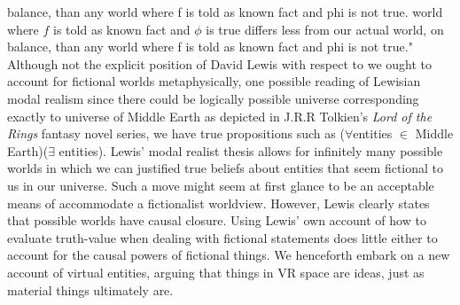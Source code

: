 balance, than any world where f is told as known fact and phi is not true.
world where $f$ is told as known fact and $\phi$ is true differs less from our actual world, on
balance, than any world where f is told as known fact and phi is not true." \cite{Lewis}
Although not the explicit position of David Lewis with respect to we ought to account for fictional worlds metaphysically, one possible reading of Lewisian modal realism  since there could be logically possible universe corresponding exactly to universe of Middle Earth as depicted in J.R.R Tolkien's \textit{Lord of the Rings} fantasy novel series, we have true propositions such as ($\forall $entities $\in$ Middle Earth)($\exists$ entities). Lewis' modal realist thesis allows for infinitely many possible worlds in which we can justified true beliefs about entities that seem fictional to us in our universe. Such a move might seem at first glance to be an acceptable means of 
accommodate a fictionalist worldview. However, Lewis clearly states that possible worlds have causal closure. Using Lewis' own account of how to evaluate truth-value when dealing with fictional statements does little either to account for the causal powers of fictional things. We henceforth embark on a new account of virtual entities, arguing that things in VR space are ideas, just as material things ultimately are.  
